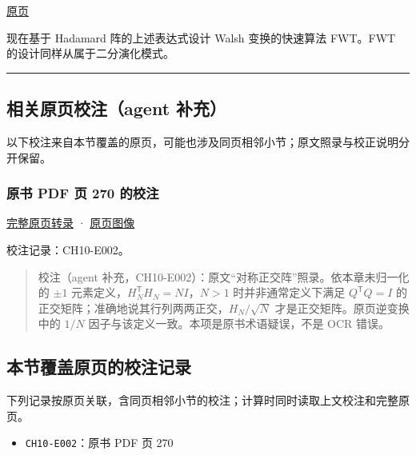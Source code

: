 \documentclass[
  10pt,
  fontset=fandol]{ctexart}
\providecommand{\tightlist}{%
  \setlength{\itemsep}{0pt}\setlength{\parskip}{0pt}}
\begin{document}
\href{../../source-images/pdf-270.jpeg}{原页}

现在基于 Hadamard 阵的上述表达式设计 Walsh 变换的快速算法 FWT。FWT 的设计同样从属于二分演化模式。

\begin{center}\rule{0.5\linewidth}{0.5pt}\end{center}

\subsection{相关原页校注（agent 补充）}\label{ux76f8ux5173ux539fux9875ux6821ux6ce8agent-ux8865ux5145}

以下校注来自本节覆盖的原页，可能也涉及同页相邻小节；原文照录与校正说明分开保留。

\subsubsection{原书 PDF 页 270 的校注}\label{ux539fux4e66-pdf-ux9875-270-ux7684ux6821ux6ce8}

\href{../pages/pdf-270.md}{完整原页转录} · \href{../../source-images/pdf-270.jpeg}{原页图像}

校注记录：CH10-E002。

\begin{quote}
校注（agent 补充，CH10-E002）：原文``对称正交阵''照录。依本章未归一化的 \(\pm1\) 元素定义，\(H_N^\mathsf{T}H_N=NI\)，\(N>1\) 时并非通常定义下满足 \(Q^\mathsf{T}Q=I\) 的正交矩阵；准确地说其行列两两正交，\(H_N/\sqrt N\) 才是正交矩阵。原页逆变换中的 \(1/N\) 因子与该定义一致。本项是原书术语疑误，不是 OCR 错误。
\end{quote}

\subsection{本节覆盖原页的校注记录}\label{ux672cux8282ux8986ux76d6ux539fux9875ux7684ux6821ux6ce8ux8bb0ux5f55}

下列记录按原页关联，含同页相邻小节的校注；计算时同时读取上文校注和完整原页。

\begin{itemize}
\tightlist
\item
  \texttt{CH10-E002}：原书 PDF 页 270
\end{itemize}
\end{document}
